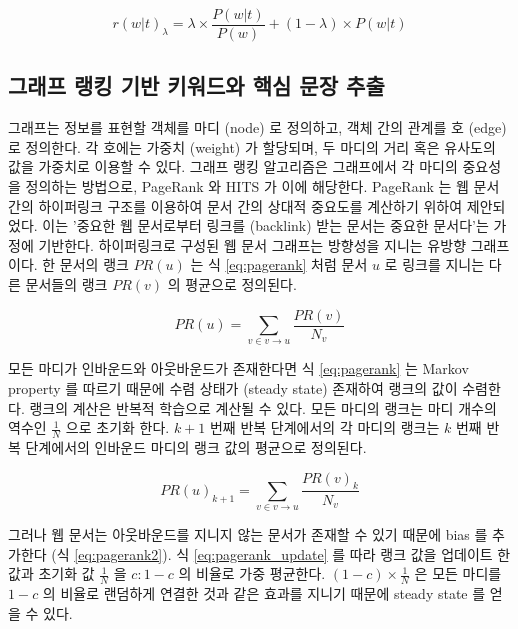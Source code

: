 \documentclass[oneside, ko,phd]{snuthesis_utf8_kor}
\begin{document}
\begin{equation}
  \label{eq:ldavis}
  r(w \vert t)_\lambda = \lambda \times \frac{P(w \vert t)}{P(w)} + (1 - \lambda) \times P(w \vert t)
\end{equation}

\subsection{그래프 랭킹 기반 키워드와 핵심 문장 추출}

그래프는 정보를 표현할 객체를 마디 (node) 로 정의하고, 객체 간의 관계를 호 (edge) 로 정의한다.
각 호에는 가중치 (weight) 가 할당되며, 두 마디의 거리 혹은 유사도의 값을 가중치로 이용할 수 있다.
그래프 랭킹 알고리즘은 그래프에서 각 마디의 중요성을 정의하는 방법으로, PageRank \cite{ilprints422}와 HITS \cite{kleinberg1999authoritative} 가 이에 해당한다.
PageRank 는 웹 문서 간의 하이퍼링크 구조를 이용하여 문서 간의 상대적 중요도를 계산하기 위하여 제안되었다.
이는 '중요한 웹 문서로부터 링크를 (backlink) 받는 문서는 중요한 문서다'는 가정에 기반한다.
하이퍼링크로 구성된 웹 문서 그래프는 방향성을 지니는 유방향 그래프이다.
한 문서의 랭크 $PR(u)$ 는 식 \ref{eq:pagerank} 처럼 문서 $u$ 로 링크를 지니는 다른 문서들의 랭크 $PR(v)$ 의 평균으로 정의된다.

\begin{equation}
  \label{eq:pagerank}
  PR(u) = \sum_{v \in v \rightarrow u} \frac{PR(v)}{N_v}
\end{equation}

모든 마디가 인바운드와 아웃바운드가 존재한다면 식 \ref{eq:pagerank} 는 Markov property 를 따르기 때문에 수렴 상태가 (steady state) 존재하여 랭크의 값이 수렴한다.
랭크의 계산은 반복적 학습으로 계산될 수 있다.
모든 마디의 랭크는 마디 개수의 역수인 $\frac{1}{N}$ 으로 초기화 한다.
$k+1$ 번째 반복 단계에서의 각 마디의 랭크는 $k$ 번째 반복 단계에서의 인바운드 마디의 랭크 값의 평균으로 정의된다.

\begin{equation}
  \label{eq:pagerank_update}
  PR(u)_{k+1} = \sum_{v \in v \rightarrow u} \frac{PR(v)_k}{N_v}
\end{equation}

그러나 웹 문서는 아웃바운드를 지니지 않는 문서가 존재할 수 있기 때문에 bias 를 추가한다 (식 \ref{eq:pagerank2}).
식 \ref{eq:pagerank_update} 를 따라 랭크 값을 업데이트 한 값과 초기화 값 $\frac{1}{N}$ 을 $c : 1-c$ 의 비율로 가중 평균한다.
$(1-c) \times \frac{1}{N}$ 은 모든 마디를 $1-c$ 의 비율로 랜덤하게 연결한 것과 같은 효과를 지니기 때문에 steady state 를 얻을 수 있다.
\end{document}
